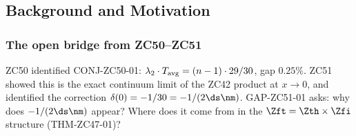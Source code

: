 \documentclass[12pt, a4paper]{article}
\begin{document}
\begin{abstract}
\sloppy
The $\mathbb{Z}_{15} = \mathbb{Z}_3\times\mathbb{Z}_5$ sector
structure of the CRF Born chain (established by THM-ZC47-01)
has a spectral signature that has not been computed explicitly
in prior Z-Programme papers.

This paper derives the complete eigenvalue spectrum of the
$\mathbb{Z}_{15}$ Z201-compatible adjacency matrix (FIND-ZC52-02),
and proves the central result:

\begin{center}
\textbf{THM-ZC52-01 (Fiedler Exactness):}
$\;\text{Fiedler}_{\rm norm}(\mathbb{Z}_{15}, \text{Z201}) = \tfrac{1}{2}$
\emph{exactly.}
\end{center}

The proof uses two lemmas: LEM-ZC52-01 (character eigenvalue
$= n_m - 2 = d_s$, deriving from the twin-prime identity
$n_m = d_s + 2$) and LEM-ZC52-02 (node degree
$= n_m + 1 = 2d_s$, from FIND-ZC50-03). Combined:
$\text{Fiedler} = 1 - d_s/(n_m+1) = 1 - d_s/(2d_s) = 1/2$.

A corollary (FIND-ZC52-01): $\text{Fiedler}/|\Zft| = (1/2)/15
= 1/(2d_s n_m) = 1/30$ — numerically equal to the Wald
correction denominator of CONJ-ZC50-01.

The bridge from $\text{Fiedler}=1/2$ to a formal proof of
CONJ-ZC50-01 remains open (GAP-ZC52-01); Phase Misalignment
PM-ZC52-01 records the failed ``product correction'' path.
All results are exact $R_0$-layer identities with zero
layer-crossing cost.
\end{abstract}

\subsection{Background and Motivation}

\subsubsection{The open bridge from ZC50--ZC51}

ZC50 identified CONJ-ZC50-01:
$\lambda_2\cdot T_{\rm avg} = (n-1)\cdot 29/30$, gap $0.25\%$.
ZC51 showed this is the exact continuum limit of the ZC42
product at $x\to 0$, and identified the correction
$\delta(0) = -1/30 = -1/(2\ds\nm)$.
GAP-ZC51-01 asks: why does $-1/(2\ds\nm)$ appear?
Where does it come from in the $\Zft = \Zth\times\Zfi$
structure (THM-ZC47-01)?
\end{document}
